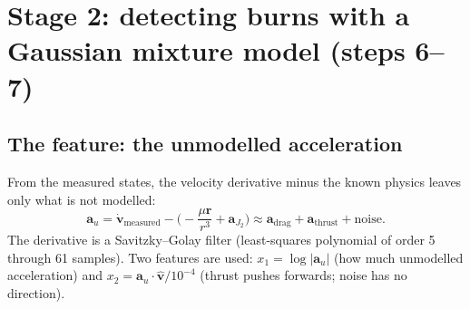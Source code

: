 \documentclass[11pt,a4paper]{article}
\begin{document}
\section{Stage 2: detecting burns with a Gaussian mixture model (steps 6--7)}\label{sec:gmm}
\subsection{The feature: the unmodelled acceleration}
From the measured states, the velocity derivative minus the known physics leaves only what is not modelled:
\begin{equation}
  \mathbf a_u = \dot{\mathbf v}_{\text{measured}} - \Big(-\frac{\mu\mathbf r}{r^3} + \mathbf a_{J_2}\Big) \approx \mathbf a_{\text{drag}} + \mathbf a_{\text{thrust}} + \text{noise}.
\end{equation}
The derivative is a Savitzky--Golay filter \cite{savgol} (least-squares polynomial of order 5 through 61 samples).
Two features are used: $x_1 = \log|\mathbf a_u|$ (how much unmodelled acceleration) and
$x_2 = \mathbf a_u\cdot\hat{\mathbf v}/10^{-4}$ (thrust pushes forwards; noise has no direction).
\end{document}
